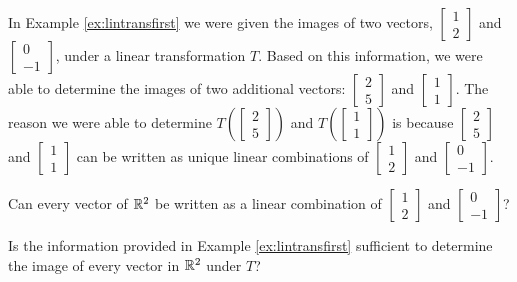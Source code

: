 \documentclass{ximera}
\begin{document}
\begin{observation}\label{obs:basisIsSufficient}
In Example \ref{ex:lintransfirst} we were given the images of two vectors, $\begin{bmatrix}1\\2\end{bmatrix}$ and $\begin{bmatrix}0\\-1\end{bmatrix}$, under a linear transformation $T$.  Based on this information, we were able to determine the images of two additional vectors: $\begin{bmatrix}2\\5\end{bmatrix}$ and $\begin{bmatrix}1\\1\end{bmatrix}$. 
The reason we were able to determine $T\left(\begin{bmatrix}2\\5\end{bmatrix}\right)$ and $T\left(\begin{bmatrix}1\\1\end{bmatrix}\right)$ is because $\begin{bmatrix}2\\5\end{bmatrix}$ and $\begin{bmatrix}1\\1\end{bmatrix}$ can be written as unique linear combinations of $\begin{bmatrix}1\\2\end{bmatrix}$ and $\begin{bmatrix}0\\-1\end{bmatrix}$.

Can every vector of $\mathbb{R}^2$ be written as a linear combination of $\begin{bmatrix}1\\2\end{bmatrix}$ and $\begin{bmatrix}0\\-1\end{bmatrix}$?
\begin{multipleChoice}
    \end{multipleChoice}
    
    Is the information provided in Example \ref{ex:lintransfirst} sufficient to determine the image of every vector in $\mathbb{R}^2$ under $T$?
    \begin{multipleChoice}
    \end{multipleChoice}
\end{observation}
\end{document}
